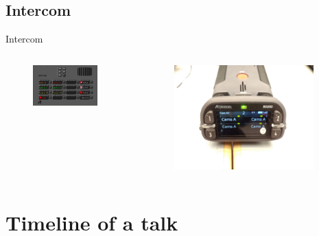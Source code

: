 \documentclass[hyperref={pdfpagelabels=false},aspectratio=169]{beamer}
\begin{document}
\subsection{Intercom} %
 \begin{frame}{Intercom}
	\begin{columns}[T,onlytextwidth]
		\begin{figure} 
		\centering
		\def\svgwidth{1\textwidth}
		\includegraphics[width=0.9\textwidth]{intercom.png} 
		\end{figure}
	\begin{figure} 
		\centering
		\def\svgwidth{1\textwidth}
		\includegraphics[width=0.93\textwidth]{bolero.jpg} 
	\end{figure}
	\end{columns}
\end{frame}
 	


\section{Timeline of a talk}  %
\end{document}
